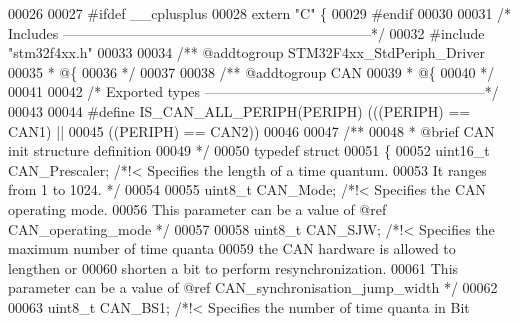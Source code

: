 \begin{DoxyCode}
00026 
00027 \textcolor{preprocessor}{#}\textcolor{preprocessor}{ifdef} \_\_cplusplus
00028  \textcolor{keyword}{extern} \textcolor{stringliteral}{"C"} \{
00029 \textcolor{preprocessor}{#}\textcolor{preprocessor}{endif}
00030 
00031 \textcolor{comment}{/* Includes ------------------------------------------------------------------*/}
00032 \textcolor{preprocessor}{#}\textcolor{preprocessor}{include} "stm32f4xx.h"
00033 
00034 \textcolor{comment}{/** @addtogroup STM32F4xx\_StdPeriph\_Driver}
00035 \textcolor{comment}{  * @\{}
00036 \textcolor{comment}{  */}
00037 
00038 \textcolor{comment}{/** @addtogroup CAN}
00039 \textcolor{comment}{  * @\{}
00040 \textcolor{comment}{  */}
00041 
00042 \textcolor{comment}{/* Exported types ------------------------------------------------------------*/}
00043 
00044 \textcolor{preprocessor}{#}\textcolor{preprocessor}{define} \textcolor{preprocessor}{IS\_CAN\_ALL\_PERIPH}\textcolor{preprocessor}{(}\textcolor{preprocessor}{PERIPH}\textcolor{preprocessor}{)} \textcolor{preprocessor}{(}\textcolor{preprocessor}{(}\textcolor{preprocessor}{(}\textcolor{preprocessor}{PERIPH}\textcolor{preprocessor}{)} \textcolor{preprocessor}{==} CAN1\textcolor{preprocessor}{)} \textcolor{preprocessor}{||}
00045                                    \textcolor{preprocessor}{(}\textcolor{preprocessor}{(}\textcolor{preprocessor}{PERIPH}\textcolor{preprocessor}{)} \textcolor{preprocessor}{==} CAN2\textcolor{preprocessor}{)}\textcolor{preprocessor}{)}
00046 
00047 \textcolor{comment}{/** }
00048 \textcolor{comment}{  * @brief  CAN init structure definition}
00049 \textcolor{comment}{  */}
00050 \textcolor{keyword}{typedef} \textcolor{keyword}{struct}
00051 \{
00052   uint16\_t CAN_Prescaler;   \textcolor{comment}{/*!< Specifies the length of a time quantum. }
00053 \textcolor{comment}{                                 It ranges from 1 to 1024. */}
00054 
00055   uint8\_t CAN_Mode;         \textcolor{comment}{/*!< Specifies the CAN operating mode.}
00056 \textcolor{comment}{                                 This parameter can be a value of @ref CAN\_operating\_mode */}
00057 
00058   uint8\_t CAN_SJW;          \textcolor{comment}{/*!< Specifies the maximum number of time quanta }
00059 \textcolor{comment}{                                 the CAN hardware is allowed to lengthen or }
00060 \textcolor{comment}{                                 shorten a bit to perform resynchronization.}
00061 \textcolor{comment}{                                 This parameter can be a value of @ref CAN\_synchronisation\_jump\_width
       */}
00062 
00063   uint8\_t CAN_BS1;          \textcolor{comment}{/*!< Specifies the number of time quanta in Bit }

\end{DoxyCode}
